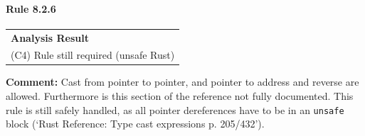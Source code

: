 \paragraph{Rule 8.2.6}
\begin{longtable}{p{13cm}}
\textbf{Analysis Result} \\
(C4) Rule still required (unsafe Rust) \\
\end{longtable}
\textbf{Comment:} Cast from pointer to pointer, and pointer to address and reverse are allowed. Furthermore is this section of the reference not fully documented. This rule is still safely handled, as all pointer dereferences have to be in an \texttt{unsafe} block (`Rust Reference: Type cast expressions p. 205/432'). \\
